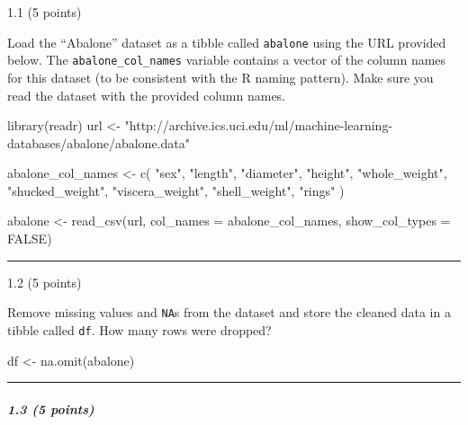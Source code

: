 \documentclass[
  letterpaper,
  DIV=11,
  numbers=noendperiod]{scrartcl}
\let\oldsubparagraph\subparagraph
\renewcommand{\subparagraph}[1]{\oldsubparagraph{#1}\mbox{}}
\newenvironment{Shaded}{\begin{snugshade}}{\end{snugshade}}
\newcommand{\AttributeTok}[1]{\textcolor[rgb]{0.40,0.45,0.13}{#1}}
\newcommand{\ConstantTok}[1]{\textcolor[rgb]{0.56,0.35,0.01}{#1}}
\newcommand{\FunctionTok}[1]{\textcolor[rgb]{0.28,0.35,0.67}{#1}}
\newcommand{\NormalTok}[1]{\textcolor[rgb]{0.00,0.23,0.31}{#1}}
\newcommand{\OtherTok}[1]{\textcolor[rgb]{0.00,0.23,0.31}{#1}}
\newcommand{\StringTok}[1]{\textcolor[rgb]{0.13,0.47,0.30}{#1}}
\begin{document}
1.1 (5 points)

Load the ``Abalone'' dataset as a tibble called \texttt{abalone} using
the URL provided below. The \texttt{abalone\_col\_names} variable
contains a vector of the column names for this dataset (to be consistent
with the R naming pattern). Make sure you read the dataset with the
provided column names.

\begin{Shaded}
\begin{Highlighting}[]
\FunctionTok{library}\NormalTok{(readr)}
\NormalTok{url }\OtherTok{\textless{}{-}} \StringTok{"http://archive.ics.uci.edu/ml/machine{-}learning{-}databases/abalone/abalone.data"}

\NormalTok{abalone\_col\_names }\OtherTok{\textless{}{-}} \FunctionTok{c}\NormalTok{(}
  \StringTok{"sex"}\NormalTok{, }
  \StringTok{"length"}\NormalTok{, }
  \StringTok{"diameter"}\NormalTok{, }
  \StringTok{"height"}\NormalTok{, }
  \StringTok{"whole\_weight"}\NormalTok{, }
  \StringTok{"shucked\_weight"}\NormalTok{, }
  \StringTok{"viscera\_weight"}\NormalTok{, }
  \StringTok{"shell\_weight"}\NormalTok{, }
  \StringTok{"rings"}
\NormalTok{)}

\NormalTok{abalone }\OtherTok{\textless{}{-}} \FunctionTok{read\_csv}\NormalTok{(url, }\AttributeTok{col\_names =}\NormalTok{ abalone\_col\_names, }\AttributeTok{show\_col\_types =} \ConstantTok{FALSE}\NormalTok{)}
\end{Highlighting}
\end{Shaded}

\begin{center}\rule{0.5\linewidth}{0.5pt}\end{center}

1.2 (5 points)

Remove missing values and \texttt{NA}s from the dataset and store the
cleaned data in a tibble called \texttt{df}. How many rows were dropped?

\begin{Shaded}
\begin{Highlighting}[]
\NormalTok{df }\OtherTok{\textless{}{-}} \FunctionTok{na.omit}\NormalTok{(abalone)}
\end{Highlighting}
\end{Shaded}

\begin{center}\rule{0.5\linewidth}{0.5pt}\end{center}

\hypertarget{points-3}{%
\subparagraph{1.3 (5 points)}\label{points-3}}
\end{document}
